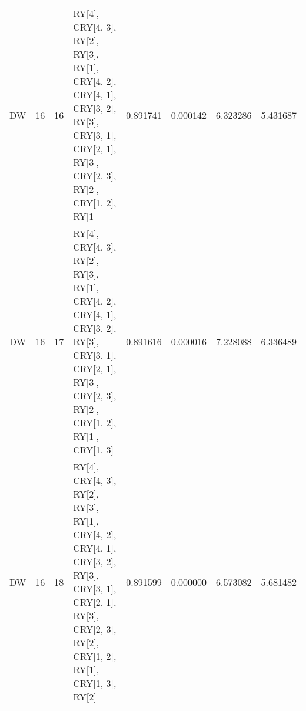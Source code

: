 \begin{tabular}{lrrlrrrr}
DW & 16 & 16 & RY[4], CRY[4, 3], RY[2], RY[3], RY[1], CRY[4, 2], CRY[4, 1], CRY[3, 2], RY[3], CRY[3, 1], CRY[2, 1], RY[3], CRY[2, 3], RY[2], CRY[1, 2], RY[1] & 0.891741 & 0.000142 & 6.323286 & 5.431687 \\
DW & 16 & 17 & RY[4], CRY[4, 3], RY[2], RY[3], RY[1], CRY[4, 2], CRY[4, 1], CRY[3, 2], RY[3], CRY[3, 1], CRY[2, 1], RY[3], CRY[2, 3], RY[2], CRY[1, 2], RY[1], CRY[1, 3] & 0.891616 & 0.000016 & 7.228088 & 6.336489 \\
DW & 16 & 18 & RY[4], CRY[4, 3], RY[2], RY[3], RY[1], CRY[4, 2], CRY[4, 1], CRY[3, 2], RY[3], CRY[3, 1], CRY[2, 1], RY[3], CRY[2, 3], RY[2], CRY[1, 2], RY[1], CRY[1, 3], RY[2] & 0.891599 & 0.000000 & 6.573082 & 5.681482 \\
\bottomrule
\end{tabular}
